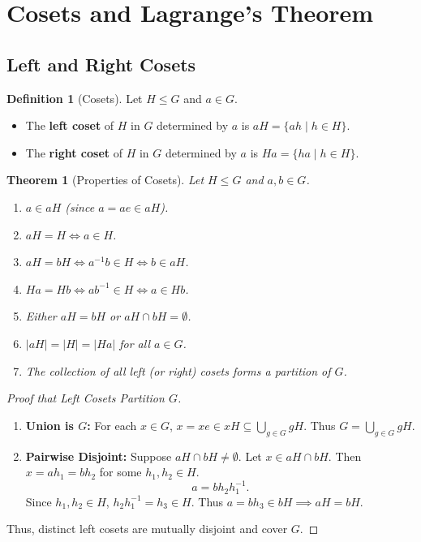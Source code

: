 \documentclass[12pt]{article}
\theoremstyle{definition}
\newtheorem{definition}{Definition}[section]
\theoremstyle{plain}
\newtheorem{theorem}{Theorem}[section]
\begin{document}
\section{Cosets and Lagrange's Theorem}

\subsection{Left and Right Cosets}

\begin{definition}[Cosets]
Let $H \le G$ and $a \in G$.
\begin{itemize}
    \item The \textbf{left coset} of $H$ in $G$ determined by $a$ is $aH = \{ah \mid h \in H\}$.
    \item The \textbf{right coset} of $H$ in $G$ determined by $a$ is $Ha = \{ha \mid h \in H\}$.
\end{itemize}
\end{definition}

\begin{theorem}[Properties of Cosets]
Let $H \le G$ and $a, b \in G$.
\begin{enumerate}
    \item $a \in aH$ (since $a = ae \in aH$).
    \item $aH = H \iff a \in H$.
    \item $aH = bH \iff a^{-1}b \in H \iff b \in aH$.
    \item $Ha = Hb \iff ab^{-1} \in H \iff a \in Hb$.
    \item Either $aH = bH$ or $aH \cap bH = \emptyset$.
    \item $|aH| = |H| = |Ha|$ for all $a \in G$.
    \item The collection of all left (or right) cosets forms a partition of $G$.
\end{enumerate}
\end{theorem}

\begin{proof}[Proof that Left Cosets Partition $G$]
\begin{enumerate}
    \item \textbf{Union is $G$:} For each $x \in G$, $x = xe \in xH \subseteq \bigcup_{g \in G} gH$. Thus $G = \bigcup_{g \in G} gH$.
    \item \textbf{Pairwise Disjoint:} Suppose $aH \cap bH \neq \emptyset$.
    Let $x \in aH \cap bH$. Then $x = ah_1 = bh_2$ for some $h_1, h_2 \in H$.
    \[
    a = bh_2 h_1^{-1}.
    \]
    Since $h_1, h_2 \in H$, $h_2 h_1^{-1} = h_3 \in H$.
    Thus $a = bh_3 \in bH \implies aH = bH$.
\end{enumerate}
Thus, distinct left cosets are mutually disjoint and cover $G$.
\end{proof}
\end{document}
